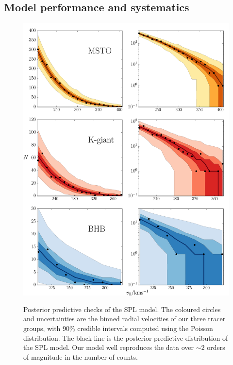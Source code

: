 \documentclass[useAMS,twocolumn,usenatbib]{mn2e}
\begin{document}
\subsection{Model performance and systematics}
\label{sec:model_performance}

\begin{figure}
\includegraphics[width=1.5\columnwidth]{plots/ppc}\\
\caption{Posterior predictive checks of the SPL model. The coloured circles 
and uncertainties are the binned radial velocities of our three tracer 
groups, with 90\% credible intervals computed using the Poisson distribution. The black line is the 
posterior predictive distribution of the SPL model. Our model well reproduces the 
data over $\sim 2$ orders of magnitude in the number of counts.}
\label{fig:ppc}
\end{figure}
\end{document}
